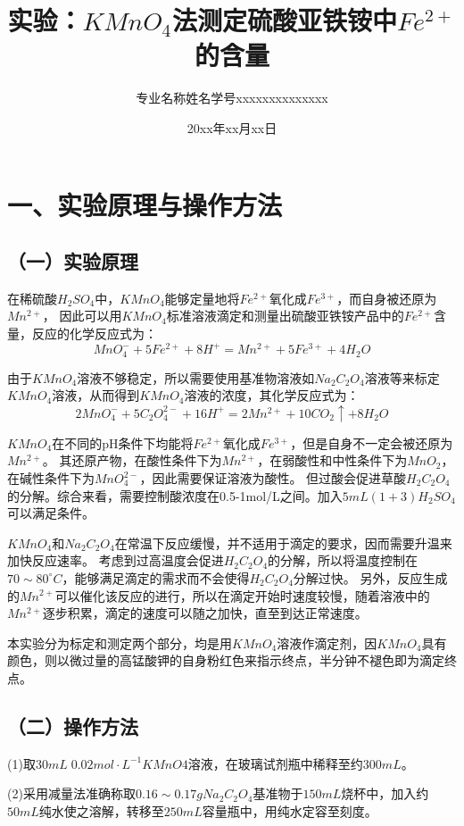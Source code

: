 \documentclass[a4paper,12pt]{article}
\title{\heiti\zihao{2} 实验：$ KMnO_4$法测定硫酸亚铁铵中$ Fe^{2+}$的含量}
\author{专业名称\quad 姓\;名\quad 学号xxxxxxxxxxxxxx}
\date{20xx年xx月xx日}
\begin{document}
\maketitle

\setcounter{section}{0}
\section*{一、实验原理与操作方法}
\subsection*{（一）实验原理}
在稀硫酸$H_2SO_4$中，$KMnO_4$能够定量地将$Fe^{2+}$氧化成$Fe^{3+}$，而自身被还原为$Mn^{2+}$，
因此可以用$KMnO_4$标准溶液滴定和测量出硫酸亚铁铵产品中的$Fe^{2+}$含量，反应的化学反应式为：
$$
MnO_4^-+5Fe^{2+}+8H^+=Mn^{2+}+5Fe^{3+}+4H_2O
$$

由于$KMnO_4$溶液不够稳定，所以需要使用基准物溶液如$Na_2C_2O_4$溶液等来标定$KMnO_4$溶液，从而得到$KMnO_4$溶液的浓度，其化学反应式为：
$$
 2MnO_4^-+5C_2O_4^{2-}+16H^+=2Mn^{2+}+10CO_2\uparrow+8H_2O
$$

$ KMnO_4$在不同的pH条件下均能将$ Fe^{2+}$氧化成$ Fe^{3+}$，但是自身不一定会被还原为$ Mn^{2+}$。
其还原产物，在酸性条件下为$ Mn^{2+}$，在弱酸性和中性条件下为$ MnO_2$，在碱性条件下为$ MnO_4^{2-}$，因此需要保证溶液为酸性。
但过酸会促进草酸$ H_2C_2O_4$的分解。综合来看，需要控制酸浓度在0.5-1mol/L之间。加入$ 5mL(1+3)H_2SO_4$可以满足条件。

$ KMnO_4$和$ Na_2C_2O_4$在常温下反应缓慢，并不适用于滴定的要求，因而需要升温来加快反应速率。
考虑到过高温度会促进$ H_2C_2O_4$的分解，所以将温度控制在$ 70\sim 80^{\circ}C$，能够满足滴定的需求而不会使得$ H_2C_2O_4$分解过快。
另外，反应生成的$ Mn^{2+}$可以催化该反应的进行，所以在滴定开始时速度较慢，随着溶液中的$ Mn^{2+}$逐步积累，滴定的速度可以随之加快，直至到达正常速度。

本实验分为标定和测定两个部分，均是用$ KMnO_4$溶液作滴定剂，因$ KMnO_4$具有颜色，则以微过量的高锰酸钾的自身粉红色来指示终点，半分钟不褪色即为滴定终点。

\subsection*{（二）操作方法}
(1)取$ 30mL \; 0.02 mol\cdot L^{-1} KMnO4$溶液，在玻璃试剂瓶中稀释至约$ 300 mL$。

(2)采用减量法准确称取$ 0.16\sim 0.17 g Na_2C_2O_4$基准物于$ 150 mL$烧杯中，加入约$ 50 mL$纯水使之溶解，转移至$ 250 mL$容量瓶中，用纯水定容至刻度。
\end{document}
